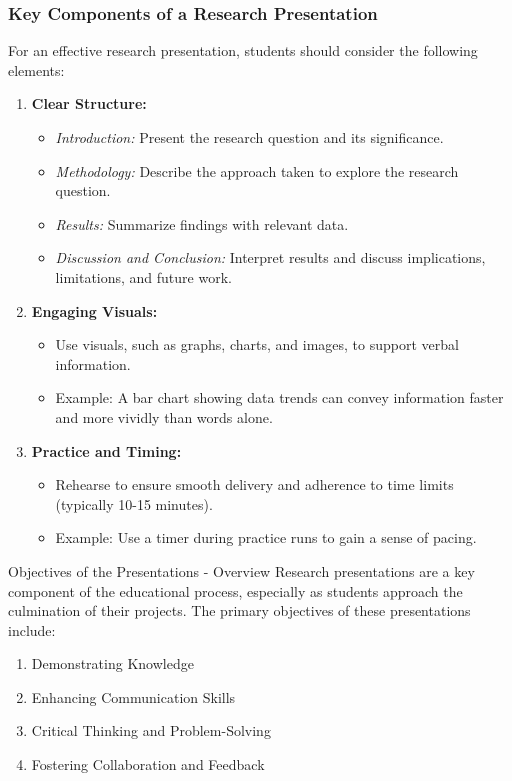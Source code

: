 \documentclass[aspectratio=169]{beamer}
\begin{document}
\begin{frame}[fragile]
    \frametitle{Key Components of a Research Presentation}
    For an effective research presentation, students should consider the following elements:
    
    \begin{enumerate}
        \item \textbf{Clear Structure:}
            \begin{itemize}
                \item \textit{Introduction:} Present the research question and its significance.
                \item \textit{Methodology:} Describe the approach taken to explore the research question.
                \item \textit{Results:} Summarize findings with relevant data.
                \item \textit{Discussion and Conclusion:} Interpret results and discuss implications, limitations, 
                and future work.
            \end{itemize}

        \item \textbf{Engaging Visuals:}
            \begin{itemize}
                \item Use visuals, such as graphs, charts, and images, to support verbal information.
                \item Example: A bar chart showing data trends can convey information faster and more vividly 
                than words alone.
            \end{itemize}

        \item \textbf{Practice and Timing:}
            \begin{itemize}
                \item Rehearse to ensure smooth delivery and adherence to time limits (typically 10-15 minutes).
                \item Example: Use a timer during practice runs to gain a sense of pacing.
            \end{itemize}
    \end{enumerate}
\end{frame}

\begin{frame}[fragile]{Objectives of the Presentations - Overview}
  Research presentations are a key component of the educational process, especially as students approach the culmination of their projects. The primary objectives of these presentations include:
  
  \begin{enumerate}
    \item Demonstrating Knowledge
    \item Enhancing Communication Skills
    \item Critical Thinking and Problem-Solving
    \item Fostering Collaboration and Feedback
  \end{enumerate}
\end{frame}
\end{document}
